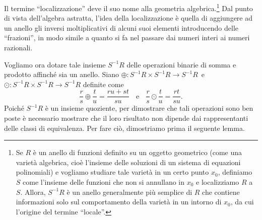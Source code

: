 \documentclass{article}
\theoremstyle{definition}
\begin{document}
\noindent Il termine ``localizzazione'' deve il suo nome alla geometria algebrica.\footnote{Se $R$ è un anello di funzioni definito su un oggetto geometrico (come una varietà algebrica, cioè l'insieme delle soluzioni di un sistema di equazioni polinomiali) e vogliamo studiare tale varietà in un certo punto $x_0$, definiamo $S$ come l'insieme delle funzioni che non si annullano in $x_0$ e localizziamo $R$ a $S$. Allora, $S^{-1}R$ è un anello generalmente più semplice di $R$ che contiene informazioni solo sul comportamento della varietà in un intorno di $x_0$, da cui l'origine del termine ``locale''.} Dal punto di vista dell'algebra astratta, l'idea della localizzazione è quella di aggiungere ad un anello gli inversi moltiplicativi di alcuni suoi elementi introducendo delle ``frazioni'', in modo simile a quanto si fa nel passare dai numeri interi ai numeri razionali.

\noindent  Vogliamo ora dotare tale insieme $S^{-1}R$ delle operazioni binarie di somma e prodotto affinché sia un anello. Siano $\oplus\colon S^{-1}R\times S^{-1}R\to S^{-1}R$\, e \,$\odot \colon S^{-1}R\times S^{-1}R\to S^{-1}R$ definite come \[ \frac{r}{s}\oplus\frac{t}{u}=\frac{ru+st}{su} \ \ \, \text{ e } \, \ \ \frac{r}{s}\odot \frac{t}{u}=\frac{rt}{su}. \] Poiché $S^{-1}R$ è un insieme quoziente, per dimostrare che tali operazioni sono ben poste è necessario mostrare che il loro risultato non dipende dai rappresentanti delle classi di equivalenza. Per fare ciò, dimostriamo prima il seguente lemma.
\end{document}
